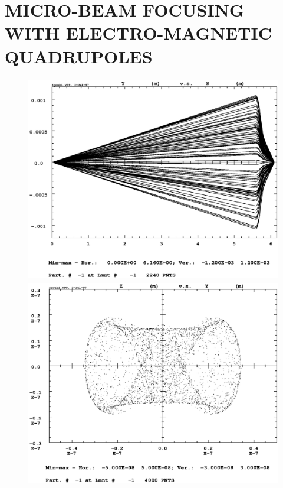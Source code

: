 \clearpage

\onecolumn



\section{MICRO-BEAM FOCUSING WITH ELECTRO-MAGNETIC QUADRUPOLES}
\vfill

\begin{figure}[H]
  \centerline{\includegraphics[height=9cm]{FigC7-1.ps}}
  \centerline{\includegraphics[height=9cm]{FigC7-2.ps}}

\end{figure}
